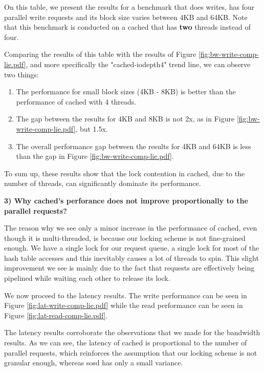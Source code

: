 On this table, we present the results for a benchmark that does writes, has 
four parallel write requests and its block size varies between 4KB and 64KB.  
Note that this benchmark is conducted on a cached that has \textbf{two} threads 
instead of four.

Comparing the results of this table with the results of Figure 
\ref{fig:bw-write-comp-lie.pdf}, and more specifically the "cached-iodepth4" 
trend line, we can observe two things:

\begin{enumerate}
	\item The performance for small block sizes (4KB - 8KB) is better than the 
		performance of cached with 4 threads.
	\item The gap between the results for 4KB and 8KB is not 2x, as in Figure 
		\ref{fig:bw-write-comp-lie.pdf}, but 1.5x.
	\item The overall performance gap between the results for 4KB and 64KB is 
		less than the gap in Figure \ref{fig:bw-write-comp-lie.pdf}.
\end{enumerate}

To sum up, these results show that the lock contention in cached, due to the 
number of threads, can significantly dominate its performance.

\textbf{3) Why cached's perforance does not improve proportionally to the 
	parallel requests?}

The reason why we see only a minor increase in the performance of cached, even 
though it is multi-threaded, is because our locking scheme is not fine-grained 
enough. We have a single lock for our request queue, a single lock for most of 
the hash table accesses and this inevitably causes a lot of threads to spin.  
This slight improvement we see is mainly due to the fact that requests are 
effectively being pipelined while waiting each other to release its lock.  

We now proceed to the latency results. The write performance can be seen in 
Figure \ref{fig:lat-write-comp-lie.pdf} while the read performance can be seen 
in Figure \ref{fig:lat-read-comp-lie.pdf}.


The latency results corroborate the observations that we made for the bandwidth 
results. As we can see, the latency of cached is proportional to the number of 
parallel requests, which reinforces the assumption that our locking scheme is 
not granular enough, whereas sosd has only a small variance.

